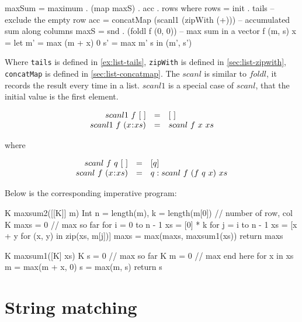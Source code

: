 \documentclass[b5paper]{article}
\begin{document}
\begin{Answer}[ref = {ex:max-subsum}]
{\begin{Haskell}
maxSum = maximum . (map maxS) . acc . rows where
    rows = init . tails              -- exclude the empty row
    acc = concatMap (scanl1 (zipWith (+))) -- accumulated sum along columns
    maxS = snd . (foldl f (0, 0))    -- max sum in a vector
    f (m, s) x = let m' = max (m + x) 0
                     s' = max m' s in (m', s')
\end{Haskell}

Where \texttt{tails} is defined in \cref{ex:list-tails}, \texttt{zipWith} is defined in \cref{sec:list-zipwith}, \texttt{concatMap} is defined in \cref{sec:list-concatmap}. The $scanl$ is similar to $foldl$, it records the result every time in a list. $scanl1$ is a special case of $scanl$, that the initial value is the first element.

\[
\begin{array}{rcl}
scanl1\ f\ [\ ] & = & [\ ] \\
scanl1\ f\ (x \mathbin{\!:\!} xs) & = & scanl\ f\ x\ xs \\
\end{array}
\]

where

\[
\begin{array}{rcl}
scanl\ f\ q\ [\ ] & = & [q] \\
scanl\ f\ (x \mathbin{\!:\!} xs) & = & q : scanl\ f\ (f\ q\ x)\ xs \\
\end{array}
\]

Below is the corresponding imperative program:

\begin{Bourbaki}
K maxsum2([[K]] m) {
    Int n = length(m), k = length(m[0]) // number of row, col
    K maxs = 0            // max so far
    for i = 0 to n - 1 {
        xs = [0] * k
        for j = i to n - 1 {
            xs = [x + y for (x, y) in zip(xs, m[j])]
            maxs = max(maxs, maxsum1(xs))
        }
    }
    return maxs
}

K maxsum1([K] xs) {
    K s = 0 // max so far
    K m = 0 // max end here
    for x in xs {
        m = max(m + x, 0)
        s = max(m, s)
    }
    return s
}
\end{Bourbaki}
}
\end{Answer}

\section{String matching}
\end{document}
